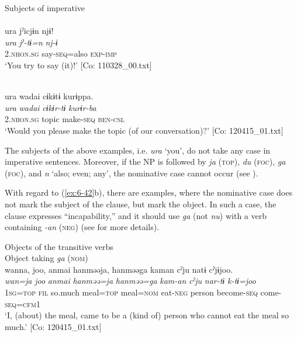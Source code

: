 \ea\label{ex:6-44}
 Subjects of imperative\\
 \ea{}\\
{\TM}
\glll  ura  jˀicjɨn  njɨ!\\
\textit{ura}  \textit{jˀ-tɨ=n}  \textit{nj-ɨ}\\
2.\textsc{nhon}.\textsc{sg}  say-\textsc{seq}=also  \textsc{exp}-\textsc{imp}\\
\glt ‘You try to say (it)!’ [Co: 110328\_00.txt]

\ex{}\\
{\TM}
\glll  ura  {\textbar}wadai{\textbar}  cɨkɨtɨ  kurɨppa.\\
\textit{ura}  \textit{wadai}  \textit{cɨkɨr-tɨ}  \textit{kurɨr-ba}\\
2.\textsc{nhon}.\textsc{sg}  topic  make-\textsc{seq}  \textsc{ben}-\textsc{csl}\\
\glt ‘Would you please make the topic (of our conversation)?’ [Co: 120415\_01.txt]
\z
\z

The subjects of the above examples, i.e. \textit{ura} ‘you’, do not take any case in imperative sentences. Moreover, if the NP is followed by \textit{ja} (\textsc{top}), \textit{du} (\textsc{foc}), \textit{ga} (\textsc{foc}), and \textit{n} ‘also; even; any’, the nominative case cannot occur (see ).

  With regard to (\ref{ex:6-42}b), there are examples, where the nominative case does not mark the subject of the clause, but mark the object. In such a case, the clause expresses “incapability,” and it should use \textit{ga} (not \textit{nu}) with a verb containing \textit{-an} (\textsc{neg}) (see  for more details).

\ea\label{ex:6-45}
 Objects of the transitive verbs\\

 \ea Object taking \textit{ga} (\textsc{nom})\\
{\TM}
\glll  wanna,  joo,  anmai  hanməəja,  hanməəga  kaman  cˀju  natɨ  cˀjɨjoo.\\
\textit{wan=ja}  \textit{joo}  \textit{anmai}  \textit{hanməə=ja} \textit{hanməə=ga}  \textit{kam-an}  \textit{cˀju}  \textit{nar-tɨ}  \textit{k-tɨ=joo}\\
1\textsc{sg}=\textsc{top}  \textsc{fil}  so.much  meal=\textsc{top}  meal=\textsc{nom}  eat-\textsc{neg}  person  become-\textsc{seq}  come-\textsc{seq}=\textsc{cfm}1\\
\glt ‘I, (about) the meal, came to be a (kind of) person who cannot eat the meal so much.’ [Co: 120415\_01.txt]


